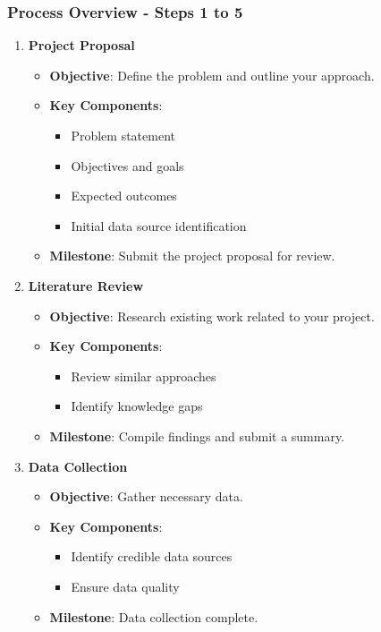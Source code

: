 \documentclass[aspectratio=169]{beamer}
\begin{document}
\begin{frame}[fragile]
  \frametitle{Process Overview - Steps 1 to 5}
  \begin{enumerate}
    \item \textbf{Project Proposal}
      \begin{itemize}
        \item \textbf{Objective}: Define the problem and outline your approach.
        \item \textbf{Key Components}:
          \begin{itemize}
            \item Problem statement
            \item Objectives and goals
            \item Expected outcomes
            \item Initial data source identification
          \end{itemize}
        \item \textbf{Milestone}: Submit the project proposal for review.
      \end{itemize}
    
    \item \textbf{Literature Review}
      \begin{itemize}
        \item \textbf{Objective}: Research existing work related to your project.
        \item \textbf{Key Components}:
          \begin{itemize}
            \item Review similar approaches
            \item Identify knowledge gaps
          \end{itemize}
        \item \textbf{Milestone}: Compile findings and submit a summary.
      \end{itemize}
    
    \item \textbf{Data Collection}
      \begin{itemize}
        \item \textbf{Objective}: Gather necessary data.
        \item \textbf{Key Components}:
          \begin{itemize}
            \item Identify credible data sources
            \item Ensure data quality
          \end{itemize}
        \item \textbf{Milestone}: Data collection complete.
      \end{itemize}


\end{enumerate}
\end{frame}
\end{document}
